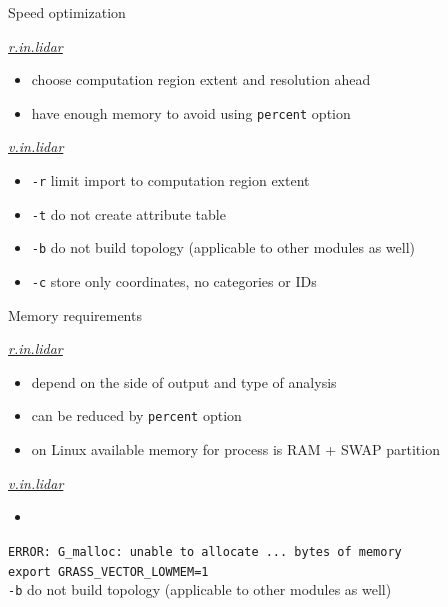 \documentclass[xcolor={dvipsnames,usenames},beamer,aspectratio=169]{beamer}
\newcommand{\gmodule}[1]{\href{http://grass.osgeo.org/grass71/manuals/#1.html}{\emph{#1}}}
\begin{document}
\begin{frame}{Speed optimization}

\begin{block}{\gmodule{r.in.lidar}}
 \begin{itemize}
  \item choose computation region extent and resolution ahead
  \item have enough memory to avoid using \texttt{percent} option
 \end{itemize}
\end{block}


\begin{block}{\gmodule{v.in.lidar}}
 \begin{itemize}
  \item \texttt{-r} limit import to computation region extent
  \item \texttt{-t} do not create attribute table
  \item \texttt{-b} do not build topology (applicable to other modules as well)
  \item \texttt{-c} store only coordinates, no categories or IDs
 \end{itemize}
\end{block}

\end{frame}

\begin{frame}{Memory requirements}

\begin{block}{\gmodule{r.in.lidar}}
 \begin{itemize}
  \item depend on the side of output and type of analysis
  \item can be reduced by \texttt{percent} option
  \item on Linux available memory for process is RAM + SWAP partition
 \end{itemize}
\end{block}


\begin{block}{\gmodule{v.in.lidar}}
 \begin{itemize}
  \item
 \end{itemize}
\end{block}

\texttt{ERROR: G\_malloc: unable to allocate ... bytes of memory}\\
\texttt{export GRASS\_VECTOR\_LOWMEM=1}\\
\texttt{-b} do not build topology (applicable to other modules as well)

\end{frame}
\end{document}
